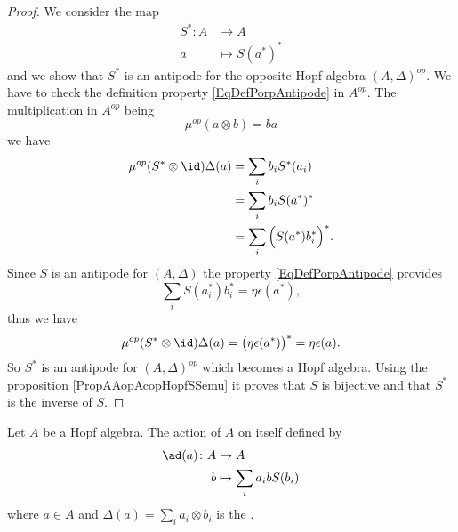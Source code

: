 \begin{proof}
    We consider the map
    \begin{equation}
        \begin{aligned}
            S^*\colon A&\to A \\
            a&\mapsto S(a^*)^* 
        \end{aligned}
    \end{equation}
    and we show that \( S^*\) is an antipode for the opposite Hopf algebra \( (A,\Delta)^{op}\). We have to check the definition property \eqref{EqDefPorpAntipode} in \( A^{op}\). The multiplication in \( A^{op}\) being
    \begin{equation}
        \mu^{op}(a\otimes b)=ba
    \end{equation}
    we have
    \begin{equation}
        \begin{aligned}[]
            \mu^{op}(S^*\otimes \id)\Delta(a)&=\sum_ib_iS^*(a_i)\\
            &=\sum_ib_iS(a^*)^*\\
            &=\sum_i\Big( S(a^*)b_i^* \Big)^*.
        \end{aligned}
    \end{equation}
    Since \( S\) is an antipode for \( (A,\Delta)\) the property \eqref{EqDefPorpAntipode} provides
    \begin{equation}
        \sum_iS(a_i^*)b_i^*=\eta\epsilon(a^*),
    \end{equation}
    thus we have
    \begin{equation}
        \mu^{op}(S^*\otimes \id)\Delta(a)=\big( \eta\epsilon(a^*) \big)^*=\eta\epsilon(a).
    \end{equation}
    So \( S^*\) is an antipode for \( (A,\Delta)^{op}\) which becomes a Hopf algebra. Using the proposition \ref{PropAAopAcopHopfSSemu} it proves that \( S\) is bijective and that \( S^*\) is the inverse of \( S\).
\end{proof}

\begin{definition}
    Let \( A\) be a Hopf algebra. The action of \( A\) on itself defined by
    \begin{equation}
        \begin{aligned}
            \ad(a)\colon A&\to A \\
            b&\mapsto \sum_i a_i bS(b_i) 
        \end{aligned}
    \end{equation}
    where \( a\in A\) and \( \Delta(a)=\sum_i a_i\otimes b_i\) is the .
\end{definition}

